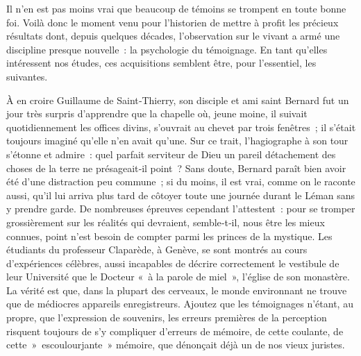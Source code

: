 \documentclass[french,twoside]{book} %
\begin{document}
\noindent Il n’en est pas moins vrai que beaucoup de témoins se trompent en toute bonne foi. Voilà donc le moment venu pour l’historien de mettre à profit les précieux résultats dont, depuis quelques décades, l’observation sur le vivant a armé une discipline presque nouvelle : la psychologie du témoignage. En tant qu’elles intéressent nos études, ces acquisitions semblent être, pour l’essentiel, les suivantes.\par
À en croire Guillaume de Saint‑Thierry, son disciple et ami saint Bernard fut un jour très surpris d’apprendre que la chapelle où, jeune moine, il suivait quotidiennement les offices divins, s’ouvrait au chevet par trois fenêtres ; il s’était toujours imaginé qu’elle n’en avait qu’une. Sur ce trait, l’hagiographe à son tour s’étonne et admire : quel parfait serviteur  
\label{p47} de Dieu un pareil détachement des choses de la terre ne présageait‑il point ? Sans doute, Bernard paraît bien avoir été d’une distraction peu commune ; si du moins, il est vrai, comme on le raconte aussi, qu’il lui arriva plus tard de côtoyer toute une journée durant le Léman sans y prendre garde. De nombreuses épreuves cependant l’attestent : pour se tromper grossièrement sur les réalités qui devraient, semble‑t‑il, nous être les mieux connues, point n’est besoin de compter parmi les princes de la mystique. Les étudiants du professeur Claparède, à Genève, se sont montrés au cours d’expériences célèbres, aussi incapables de décrire cor­rectement le vestibule de leur Université que le Docteur « à la parole de miel », l’église de son monastère. La vérité est que, dans la plupart des cerveaux, le monde environnant ne trouve que de médiocres appareils enregistreurs. Ajoutez que les témoignages n’étant, au propre, que l’expres­sion de souvenirs, les erreurs premières de la perception risquent toujours de s’y compliquer d’erreurs de mémoire, de cette coulante, de cette » escou­lourjante » mémoire, que dénonçait déjà un de nos vieux juristes.\par
\end{document}
